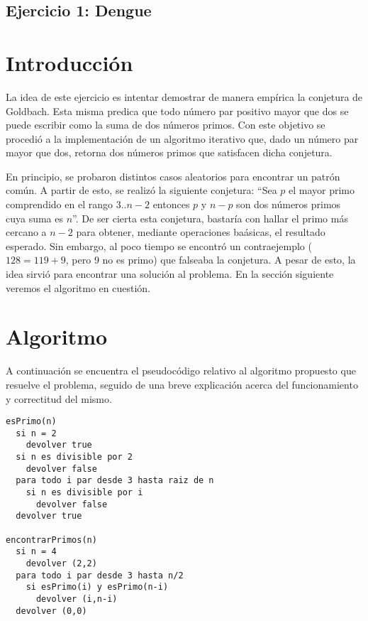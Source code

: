 \documentclass[a4paper,10pt] {article}
\begin{document}
\begin{center}
\section*{Ejercicio 1: Dengue}
\end{center}

\bigskip
\section*{Introducci\'on}

La idea de este ejercicio es intentar demostrar de manera emp\'irica la
conjetura de Goldbach. Esta misma predica que todo n\'umero par positivo mayor
que dos se puede escribir como la suma de dos n\'umeros primos. Con este
objetivo se procedi\'o a la implementaci\'on de un algoritmo iterativo que, dado
un n\'umero par mayor que dos, retorna dos n\'umeros primos que satisfacen dicha
conjetura.

En principio, se probaron distintos casos aleatorios para encontrar un patr\'on
com\'un. A partir de esto, se realiz\'o la siguiente conjetura: ``Sea $p$ el mayor primo comprendido en el rango $3..n-2$ entonces $p$ y $n-p$ son dos n\'umeros primos cuya suma es $n$''. De ser cierta esta conjetura, bastar\'ia con hallar el primo m\'as cercano a $n-2$ para obtener, mediante operaciones ba\'asicas, el resultado esperado. Sin embargo, al poco tiempo se encontr\'o un contraejemplo ($128 = 119 + 9$, pero 9 no es primo) que falseaba la conjetura. A pesar de esto, la idea sirvi\'o para encontrar una soluci\'on al problema. En la secci\'on siguiente veremos el algoritmo en cuesti\'on.

\section*{Algoritmo}

A continuaci\'on se encuentra el pseudoc\'odigo relativo al algoritmo propuesto
que resuelve el problema, seguido de una breve explicaci\'on acerca del
funcionamiento y correctitud del mismo.

\begin{verbatim}
esPrimo(n)
  si n = 2 
    devolver true
  si n es divisible por 2
    devolver false
  para todo i par desde 3 hasta raiz de n
    si n es divisible por i
      devolver false
  devolver true

encontrarPrimos(n)
  si n = 4
    devolver (2,2)
  para todo i par desde 3 hasta n/2
    si esPrimo(i) y esPrimo(n-i)
      devolver (i,n-i)
  devolver (0,0)
\end{verbatim}
\end{document}
